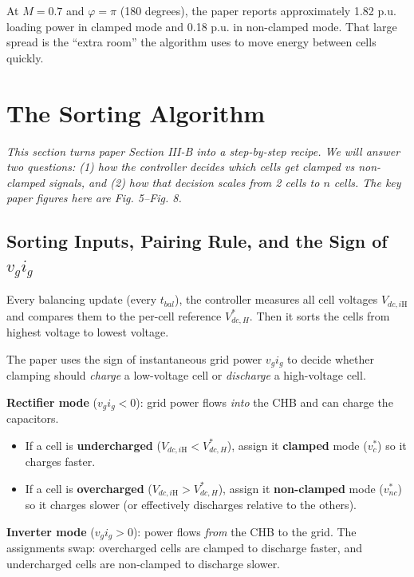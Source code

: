 \documentclass[12pt, a4paper]{article}
\def\,{ }%
\newcommand{\vg}{v_{g}}
\newcommand{\ig}{i_{g}}
\newcommand{\Vdci}[1]{V_{dc,#1\mathrm{H}}}
\newcommand{\phic}{\varphi}
\begin{document}
\begin{statebox}[Numbers to remember from paper Fig.\,8]
At $M=0.7$ and $\phic=\pi$ (180 degrees), the paper reports approximately
1.82 p.u. loading power in clamped mode and 0.18 p.u. in non-clamped mode.
That large spread is the ``extra room'' the algorithm uses to move energy between
cells quickly.
\end{statebox}

\clearpage

\section{The Sorting Algorithm}
\label{sec:algorithm}

\textit{This section turns paper Section III-B into a step-by-step recipe.
We will answer two questions:
(1) how the controller decides which cells get clamped vs non-clamped signals,
and (2) how that decision scales from 2 cells to $n$ cells.
The key paper figures here are Fig.\,5--Fig.\,8.}

\subsection{Sorting Inputs, Pairing Rule, and the Sign of $\vg\ig$}
\label{subsec:sorting}

Every balancing update (every $t_{bal}$), the controller measures all cell voltages
$\Vdci{i}$ and compares them to the per-cell reference $V_{dc,H}^{*}$.
Then it sorts the cells from highest voltage to lowest voltage.

The paper uses the sign of instantaneous grid power $\vg\ig$ to decide whether
clamping should \emph{charge} a low-voltage cell or \emph{discharge} a high-voltage
cell.

\begin{statebox}
\textbf{Rectifier mode} ($\vg\ig < 0$): grid power flows \emph{into} the CHB and can
charge the capacitors.
\begin{itemize}
    \item If a cell is \textbf{undercharged} ($\Vdci{i} < V_{dc,H}^{*}$), assign it
          \textbf{clamped} mode ($v_c^{*}$) so it charges faster.
    \item If a cell is \textbf{overcharged} ($\Vdci{i} > V_{dc,H}^{*}$), assign it
          \textbf{non-clamped} mode ($v_{nc}^{*}$) so it charges slower (or
          effectively discharges relative to the others).
\end{itemize}

\textbf{Inverter mode} ($\vg\ig > 0$): power flows \emph{from} the CHB to the grid.
The assignments swap: overcharged cells are clamped to discharge faster, and
undercharged cells are non-clamped to discharge slower.
\end{statebox}
\end{document}
